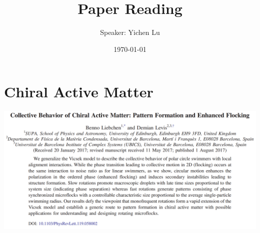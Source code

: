 \documentclass[10pt,aspectratio=43,mathserif,table]{beamer}
\title{Paper Reading}
\author{Speaker: Yichen Lu\quad \newline  \newline \quad }
\institute{\fontsize{8pt}{14pt}}
\date{\today}
\begin{document}

\section{Chiral Active Matter}

\begin{frame}
    \centering
    \includegraphics[width=\textwidth]{figs/title1.png}
\end{frame}
\end{document}
